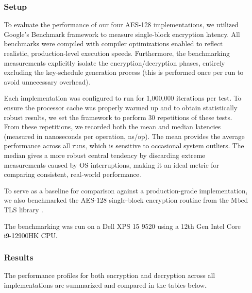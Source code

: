 \subsubsection{Setup}

To evaluate the performance of our four AES-128 implementations, we utilized Google's Benchmark framework \cite{google_benchmark} to measure single-block encryption latency. All benchmarks were compiled with compiler optimizations enabled to reflect realistic, production-level execution speeds. Furthermore, the benchmarking measurements explicitly isolate the encryption/decryption phases, entirely excluding the key-schedule generation process (this is performed once per run to avoid unnecessary overhead).

Each implementation was configured to run for 1,000,000 iterations per test. To ensure the processor cache was properly warmed up and to obtain statistically robust results, we set the framework to perform 30 repetitions of these tests. From these repetitions, we recorded both the mean and median latencies (measured in nanoseconds per operation, ns/op). The mean provides the average performance across all runs, which is sensitive to occasional system outliers. The median gives a more robust central tendency by discarding extreme measurements caused by OS interruptions, making it an ideal metric for comparing consistent, real-world performance.

To serve as a baseline for comparison against a production-grade implementation, we also benchmarked the AES-128 single-block encryption routine from the Mbed TLS library \cite{mbedtls_library}.

The benchmarking was run on a Dell XPS 15 9520 using a 12th Gen Intel Core i9-12900HK CPU.

\subsubsection{Results}

The performance profiles for both encryption and decryption across all implementations are summarized and compared in the tables below.

